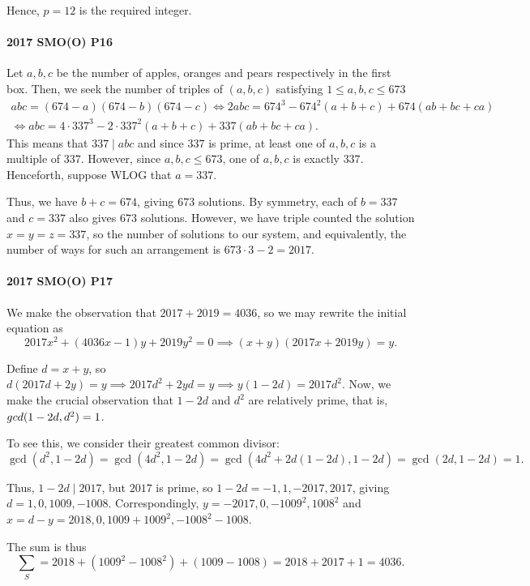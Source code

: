 \documentclass[../jarvis.tex]{subfiles}
\begin{document}
Hence, $p=\boxed{12}$ is the required integer.

\paragraph{2017 SMO(O) P16}Let $a,b,c$ be the number of apples, oranges and pears respectively in the first box. Then, we seek the number of triples of $(a,b,c)$ satisfying $1\leq a,b,c\leq 673$
\begin{align*}
    abc=(674-a)(674-b)(674-c) \iff 2abc=674^3-674^2(a+b+c)+674(ab+bc+ca) \\
    \iff abc=4\cdot 337^3-2\cdot 337^2(a+b+c)+337(ab+bc+ca).
\end{align*}
This means that $337\mid abc$ and since $337$ is prime, at least one of $a,b,c$ is a multiple of $337$. However, since $a,b,c\leq 673$, one of $a,b,c$ is exactly $337$. Henceforth, suppose WLOG that $a=337$.

Thus, we have $b+c=674$, giving $673$ solutions. By symmetry, each of $b=337$ and $c=337$ also gives $673$ solutions. However, we have triple counted the solution $x=y=z=337$, so the number of solutions to our system, and equivalently, the number of ways for such an arrangement is $673\cdot 3-2=\boxed{2017}.$

\paragraph{2017 SMO(O) P17}We make the observation that $2017+2019=4036$, so we may rewrite the initial equation as
$$2017x^2+(4036x-1)y+2019y^2=0 \implies (x+y)(2017x+2019y)=y.$$

Define $d=x+y$, so $d(2017d+2y)=y \implies 2017d^2+2yd=y \implies y(1-2d)=2017d^2$. Now, we make the crucial observation that $1-2d$ and $d^2$ are relatively prime, that is, $\\gcd(1-2d,d^2)=1$.

To see this, we consider their greatest common divisor: $$\gcd(d^2, 1-2d)=\gcd(4d^2, 1-2d)=\gcd(4d^2+2d(1-2d), 1-2d)=\gcd(2d,1-2d)=1.$$

Thus, $1-2d\mid 2017$, but $2017$ is prime, so $1-2d=-1,1,-2017,2017$, giving $d=1,0,1009,-1008$. Correspondingly, $y=-2017,0,-1009^2,1008^2$ and $x=d-y=2018,0,1009+1009^2,-1008^2-1008$.

The sum is thus 
$$\sum_{S}=2018+(1009^2-1008^2)+(1009-1008)=2018+2017+1=\boxed{4036}.$$
\end{document}
